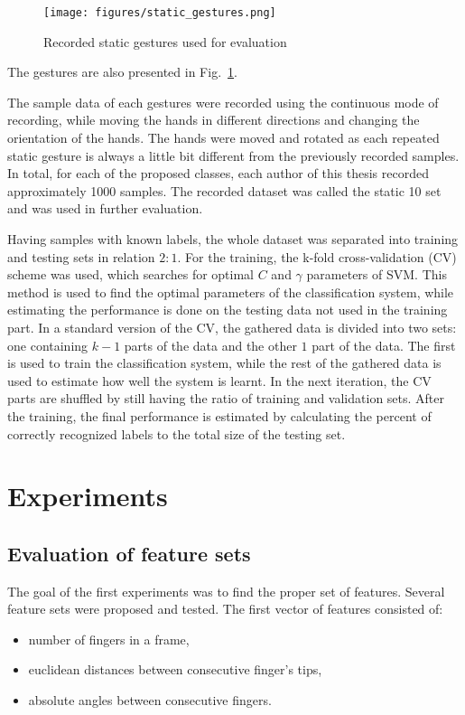 \begin{figure}[htb]
\centering
 \texttt{[image: figures/static\_gestures.png]}
 \caption{Recorded static gestures used for evaluation}
 \label{staticgesturesdata}
\end{figure}
The gestures are also presented in Fig.~\ref{staticgesturesdata}. 

The sample data of each gestures were recorded using the continuous mode of recording, while moving the hands in different directions and changing the orientation of the hands.
The hands were moved and rotated as each repeated static gesture is always a little bit different from the previously recorded samples.
In total, for each of the proposed classes, each author of this thesis recorded approximately 1000 samples.
The recorded dataset was called the static 10 set and was used in further evaluation.

Having samples with known labels, the whole dataset was separated into training and testing sets in relation $2:1$. 
For the training, the k-fold cross-validation (CV) scheme was used, which searches for optimal $C$ and $\gamma$ parameters of SVM.
This method is used to find the optimal parameters of the classification system, while estimating the performance is done on the testing data not used in the training part. 
In a standard version of the CV, the gathered data is divided into two sets: one containing $k-1$ parts of the data and the other $1$ part of the data. 
The first is used to train the classification system, while the rest of the gathered data is used to estimate how well the system is learnt.
In the next iteration, the CV parts are shuffled by still having the ratio of training and validation sets.
After the training, the final performance is estimated by calculating the percent of correctly recognized labels to the total size of the testing set.


\section{Experiments}
\label{static:exp}

\subsection{Evaluation of feature sets}

The goal of the first experiments was to find the proper set of features. Several feature sets were proposed and tested. The first vector of features consisted of:
\begin{itemize}
\item number of fingers in a frame,
\item euclidean distances between consecutive finger's tips,
\item absolute angles between consecutive fingers.
\end{itemize} 

